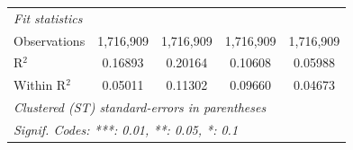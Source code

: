 \begin{tabular}{lcccc}
   \midrule
   \emph{Fit statistics}\\
   Observations                              & 1,716,909       & 1,716,909       & 1,716,909       & 1,716,909\\  
   R$^2$                                     & 0.16893         & 0.20164         & 0.10608         & 0.05988\\  
   Within R$^2$                              & 0.05011         & 0.11302         & 0.09660         & 0.04673\\  
   \midrule \midrule
   \multicolumn{5}{l}{\emph{Clustered (ST) standard-errors in parentheses}}\\
   \multicolumn{5}{l}{\emph{Signif. Codes: ***: 0.01, **: 0.05, *: 0.1}}\\
\end{tabular}
\par\endgroup


